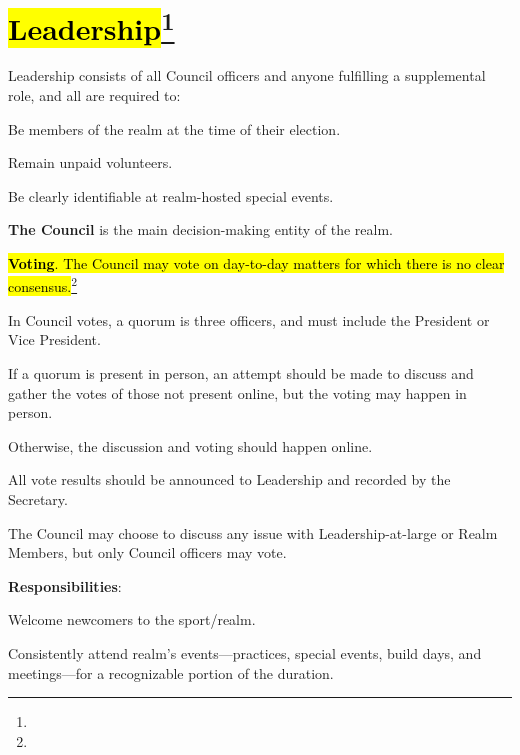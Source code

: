 \documentclass[12pt]{article}
\newcommand{\newpart}[2][]{\hl{#2}\expandafter\ifx\expandafter\relax\detokenize{#1}\relax\else\textnormal{\footnote{#1}}\fi}
\begin{document}
\section{\newpart{Leadership}}\label{leadership}
\begin{level}
    \item Leadership consists of all Council officers and anyone fulfilling a supplemental role, and all are required to:
    \begin{level}
        \item Be members of the realm at the time of their election.
        \item Remain unpaid volunteers.
        \item Be clearly identifiable at realm-hosted special events.
    \end{level}
    \item \textbf{The Council} is the main decision-making entity of the realm.\label{the_council}
    \begin{level}
        \item \newpart{\textbf{Voting}. The Council may vote on day-to-day matters for which there is no clear consensus.}
        \begin{level}
            \item In Council votes, a quorum is three officers, and must include the President or Vice President. 
            \item If a quorum is present in person, an attempt should be made to discuss and gather the votes of those not present online, but the voting may happen in person.
            \begin{level}
                \item Otherwise, the discussion and voting should happen online.
            \end{level}
            \item All vote results should be announced to Leadership and recorded by the Secretary.
            \item The Council may choose to discuss any issue with Leadership-at-large or Realm Members, but only Council officers may vote.
        \end{level}
        \item \textbf{Responsibilities}:
        \begin{level}
            \item Welcome newcomers to the sport/realm.
            \item Consistently attend realm's events---practices, special events, build days, and meetings---for a recognizable portion of the duration. 

\end{level}
\end{level}
\end{level}
\end{document}
